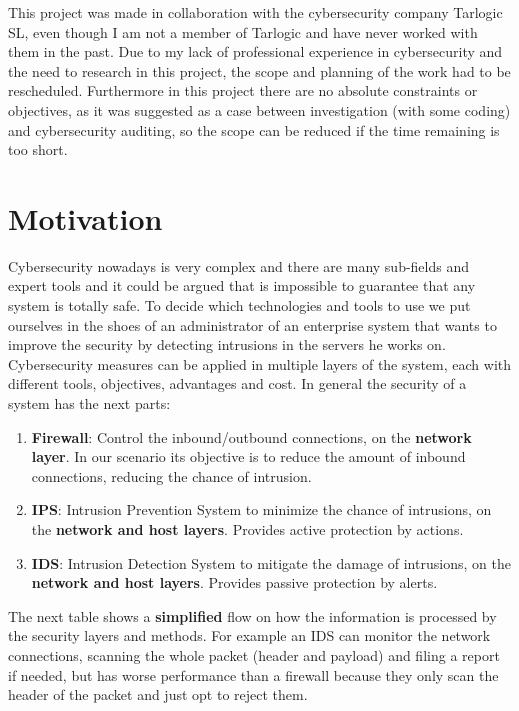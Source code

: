 
This project was made in collaboration with the cybersecurity company Tarlogic SL, even though I am not a member of Tarlogic and have never worked with them in the past.
Due to my lack of professional experience in cybersecurity and the need to research in this project, the scope and planning of the work had to be rescheduled.
Furthermore in this project there are no absolute constraints or objectives, as it was suggested as a case between investigation (with some coding) and cybersecurity auditing, so the scope can be reduced if the time remaining is too short.

\section{Motivation}

Cybersecurity nowadays is very complex and there are many sub-fields and expert tools and it could be argued that is impossible to guarantee that any system is totally safe. To decide which technologies and tools to use we put ourselves in the shoes of an administrator of an enterprise system that wants to improve the security by detecting intrusions in the servers he works on.
\linej
\linej
Cybersecurity measures can be applied in multiple layers of the system, each with different tools, objectives, advantages and cost. In general the security of a system has the next parts:
\begin{enumerate}
	\item \textbf{Firewall}: Control the inbound/outbound connections, on the \textbf{network layer}. In our scenario its objective is to reduce the amount of inbound connections, reducing the chance of intrusion.
	\item \textbf{IPS}: Intrusion Prevention System to minimize the chance of intrusions, on the \textbf{network and host layers}. Provides active protection by actions.
	\item \textbf{IDS}: Intrusion Detection System to mitigate the damage of intrusions, on the \textbf{network and host layers}. Provides passive protection by alerts.
\end{enumerate}

\linej
The next table shows a \textbf{simplified} flow on how the information is processed by the security layers and methods. For example an IDS can monitor the network connections, scanning the whole packet (header and payload) and filing a report if needed, but has worse performance than a firewall because they only scan the header of the packet and just opt to reject them\cite{firewall-ipds-ids_comparison}.

